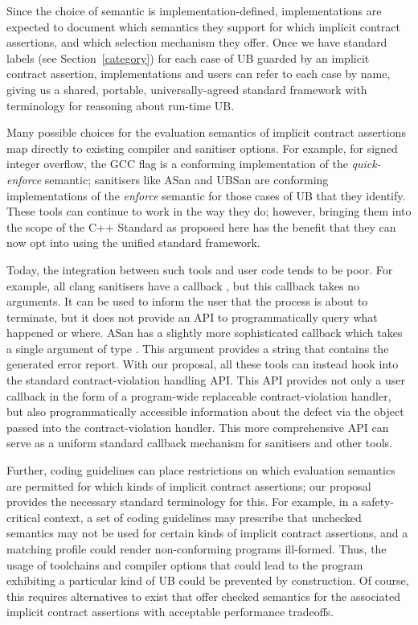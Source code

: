 Since the choice of semantic is implementation-defined, implementations are expected to document which semantics they support for which implicit contract assertions, and which selection mechanism they offer. Once we have standard labels (see Section~\ref{category}) for each case of UB guarded by an implicit contract assertion, implementations and users can refer to each case by name, giving us a shared, portable, universally-agreed standard framework with terminology for reasoning about run-time UB.

Many possible choices for the evaluation semantics of implicit contract assertions map directly to existing compiler and sanitiser options. For example, for signed integer overflow, the GCC flag  is a conforming implementation of the \emph{quick-enforce} semantic; sanitisers like ASan and UBSan are conforming implementations of the \emph{enforce} semantic for those cases of UB that they identify. These tools can continue to work in the way they do; however, bringing them into the scope of the C++ Standard as proposed here has the benefit that they can now opt into using the unified standard framework.

Today, the integration between such tools and user code tends to be poor. For example, all clang sanitisers have a callback , but this callback takes no arguments. It can be used to inform the user that the process is about to terminate, but it does not provide an API to programmatically query what happened or where. ASan has a slightly more sophisticated callback  which takes a single argument of type . This argument provides a string that contains the generated error report. With our proposal, all these tools can instead hook into the standard contract-violation handling API. This API provides not only a user callback in the form of a  program-wide replaceable contract-violation handler, but also programmatically accessible information about the defect via the  \mbox{} object passed into the contract-violation handler. This more comprehensive API can serve as a uniform standard callback mechanism for sanitisers and other tools.

Further, coding guidelines can place restrictions on which evaluation semantics are permitted for which kinds of implicit contract assertions; our proposal provides the necessary standard terminology for this. For example, in a safety-critical context, a set of coding guidelines may prescribe that unchecked semantics may not be used for certain kinds of implicit contract assertions, and a matching profile could render non-conforming programs ill-formed. Thus, the usage of toolchains and compiler options that could lead to the program exhibiting a particular kind of UB could be prevented by construction. Of course, this requires alternatives to exist that offer checked semantics for the associated implicit contract assertions with acceptable performance tradeoffs.

